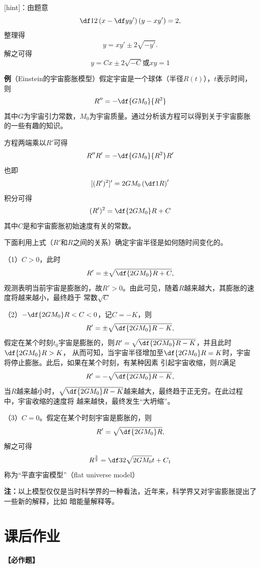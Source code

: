 [hint]：由题意
$$\df12\left(x-\df y{y'}\right)(y-xy')=2,$$
整理得
$$y=xy'\pm2\sqrt{-y'}.$$
解之可得
$$y=Cx\pm2\sqrt{-C}\mbox{或}xy=1$$

\begin{shaded}

{\bf 例}（Einstein的宇宙膨胀模型）假定宇宙是一个球体（半径$R(t)$），$t$表示时间，则
$$R''=-\df{GM_0}{R^2}$$
其中$G$为宇宙引力常数，$M_0$为宇宙质量。通过分析该方程可以得到关于宇宙膨胀的一些有趣的知识。

方程两端乘以$R'$可得
$$R''R'=-\df{GM_0}{R^2}R'$$
也即
$$[(R')^2]'=2GM_0\left(\df1R\right)'$$
积分可得
$$(R')^2=\df{2GM_0}R+C$$
其中$C$是和宇宙膨胀初始速度有关的常数。

下面利用上式（$R'$和$R$之间的关系）确定宇宙半径是如何随时间变化的。

（1）$C>0$，此时
$$R'=\pm\sqrt{\df{2GM_0}R+C},$$
观测表明当前宇宙是膨胀的，故$R'>0$。由此可见，随着$R$越来越大，其膨胀的速度将越来越小，最终趋于
常数$\sqrt C$

（2）$-\df{2GM_0}R<C<0$，记$C=-K$，则
$$R'=\pm\sqrt{\df{2GM_0}R-K},$$
假定在某个时刻$t_0$宇宙是膨胀的，则$R'=\sqrt{\df{2GM_0}R-K}$，并且此时$\df{2GM_0}R>K$，
从而可知，当宇宙半径增加至$\df{2GM_0}R=K$时，宇宙将停止膨胀。此后，如果在某个时刻，有某种因素
引起宇宙收缩，则$R$满足
$$R'=-\sqrt{\df{2GM_0}R-K},$$
当$R$越来越小时，$\sqrt{\df{2GM_0}R-K}$越来越大，最终趋于正无穷。在此过程中，宇宙收缩的速度将
越来越快，最终发生“大坍缩”。

（3）$C=0$。假定在某个时刻宇宙是膨胀的，则
$$R'=\sqrt{\df{2GM_0}R},$$
解之可得
$$R^{\frac32}=\df32\sqrt{2GM_0}t+C_1$$
称为“平直宇宙模型”（flat universe model）

{\bf 注：}以上模型仅仅是当时科学界的一种看法，近年来，科学界又对宇宙膨胀提出了一些新的解释，比如
暗能量解释等。

\end{shaded}

\newpage

\section*{课后作业}


{\bf 【必作题】}


